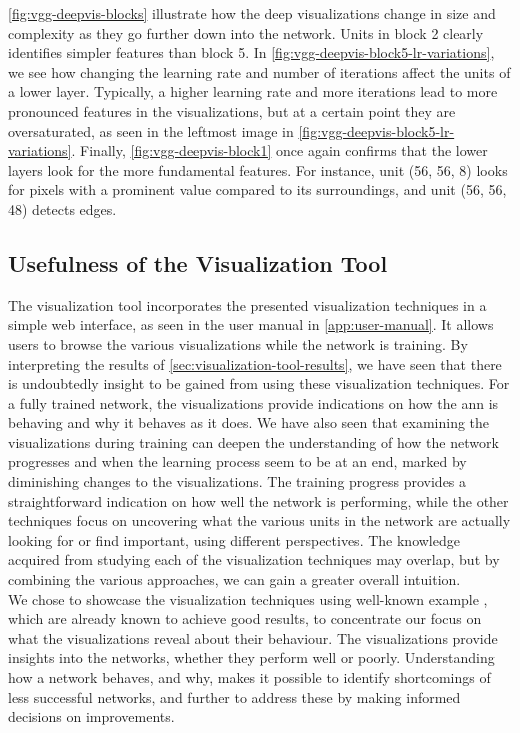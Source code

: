 \noindent \autoref{fig:vgg-deepvis-blocks} illustrate how the deep visualizations change in size and complexity as they go further down into the network. Units in block 2 clearly identifies simpler features than block 5. In \autoref{fig:vgg-deepvis-block5-lr-variations}, we see how changing the learning rate and number of iterations affect the units of a lower layer. Typically, a higher learning rate and more iterations lead to more pronounced features in the visualizations, but at a certain point they are oversaturated, as seen in the leftmost image in \ref{fig:vgg-deepvis-block5-lr-variations}. Finally, \autoref{fig:vgg-deepvis-block1} once again confirms that the lower layers look for the more fundamental features. For instance, unit (56, 56, 8) looks for pixels with a prominent value compared to its surroundings, and unit (56, 56, 48) detects edges.

\subsection{Usefulness of the Visualization Tool}

The visualization tool incorporates the presented visualization techniques in a simple web interface, as seen in the user manual in \autoref{app:user-manual}. It allows users to browse the various visualizations while the network is training. By interpreting the results of \autoref{sec:visualization-tool-results}, we have seen that there is undoubtedly insight to be gained from using these visualization techniques. For a fully trained network, the visualizations provide indications on how the \acrshort{ann} is behaving and why it behaves as it does. We have also seen that examining the visualizations during training can deepen the understanding of how the network progresses and when the learning process seem to be at an end, marked by diminishing changes to the visualizations. The training progress provides a straightforward indication on how well the network is performing, while the other techniques focus on uncovering what the various units in the network are actually looking for or find important, using different perspectives. The knowledge acquired from studying each of the visualization techniques may overlap, but by combining the various approaches, we can gain a greater overall intuition. \\

\noindent We chose to showcase the visualization techniques using well-known example , which are already known to achieve good results, to concentrate our focus on what the visualizations reveal about their behaviour. The visualizations provide insights into the networks, whether they perform well or poorly. Understanding how a network behaves, and why, makes it possible to identify shortcomings of less successful networks, and further to address these by making informed decisions on improvements. \\


